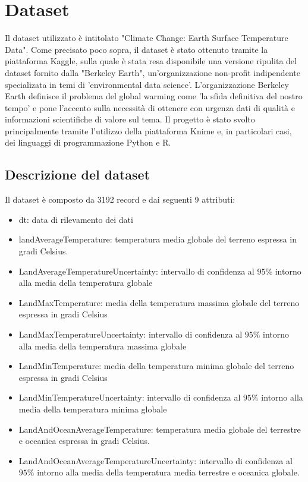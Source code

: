 \documentclass[12pt, a4paper, twocolumn]{article} %
\begin{document}

\section{Dataset}
Il dataset utilizzato è intitolato "Climate Change: Earth Surface Temperature Data". \cite{dataset} %
Come precisato poco sopra, il dataset è stato ottenuto tramite la piattaforma Kaggle, sulla quale è stata resa disponibile una versione ripulita del dataset fornito dalla "Berkeley Earth", un'organizzazione non-profit indipendente specializata in temi di 'environmental data science'.
L'organizzazione Berkeley Earth definisce il problema del global warming come 'la sfida definitiva del nostro tempo' e pone l'accento sulla necessità di ottenere con urgenza dati di qualità e informazioni scientifiche di valore sul tema.
Il progetto è stato svolto principalmente tramite l'utilizzo della piattaforma Knime e, in particolari casi, dei linguaggi di programmazione Python e R.

\subsection{Descrizione del dataset}
Il dataset è composto da 3192 record e dai seguenti 9 attributi:
\begin{itemize}
	\item dt: data di rilevamento dei dati
	\item landAverageTemperature: temperatura media globale del terreno espressa in gradi Celsius.
	\item LandAverageTemperatureUncertainty: intervallo di confidenza al $95\%$ intorno alla media della temperatura globale
	\item LandMaxTemperature: media della temperatura massima globale del terreno espressa in gradi Celsius
	\item LandMaxTemperatureUncertainty:  intervallo di confidenza al $95\%$ intorno alla media della temperatura massima globale
	\item LandMinTemperature: media della temperatura minima globale del terreno espressa in gradi Celsius
	\item LandMinTemperatureUncertainty: intervallo di confidenza al $95\%$ intorno alla media della temperatura minima globale
	\item LandAndOceanAverageTemperature: temperatura media globale del terrestre e oceanica espressa in gradi Celsius.
	\item LandAndOceanAverageTemperatureUncertainty: intervallo di confidenza al $95\%$ intorno alla media della temperatura media terrestre e oceanica globale.
\end{itemize}
\end{document}
